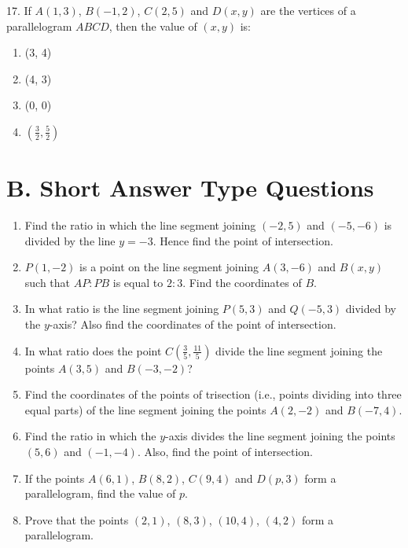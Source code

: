 \documentclass[12pt]{article}
\begin{document}
\begin{multicols}{2}
	17. If $A(1, 3)$, $B(-1, 2)$, $C(2, 5)$ and $D(x, y)$ are the vertices of a parallelogram $ABCD$, then the value of $(x, y)$ is:
	\begin{enumerate}
		\item (3, 4)
		\item (4, 3)
		\item (0, 0)
		\item $\left(\frac{3}{2}, \frac{5}{2}\right)$
	\end{enumerate}
	
	\section*{B. Short Answer Type Questions}
	
	\begin{enumerate}
		\item Find the ratio in which the line segment joining $(-2, 5)$ and $(-5, -6)$ is divided by the line $y = -3$. Hence find the point of intersection.
		
		\item $P(1, -2)$ is a point on the line segment joining $A(3, -6)$ and $B(x, y)$ such that $AP : PB$ is equal to $2 : 3$. Find the coordinates of $B$.
		
		\item In what ratio is the line segment joining $P(5, 3)$ and $Q(-5, 3)$ divided by the $y$-axis? Also find the coordinates of the point of intersection.
		
		\item In what ratio does the point $C\left(\frac{3}{5}, \frac{11}{5}\right)$ divide the line segment joining the points $A(3, 5)$ and $B(-3, -2)$?
		
		\item Find the coordinates of the points of trisection (i.e., points dividing into three equal parts) of the line segment joining the points $A(2, -2)$ and $B(-7, 4)$.
		
		\item Find the ratio in which the $y$-axis divides the line segment joining the points $(5, 6)$ and $(-1, -4)$. Also, find the point of intersection.
		
		\item If the points $A(6, 1)$, $B(8, 2)$, $C(9, 4)$ and $D(p, 3)$ form a parallelogram, find the value of $p$.
		
		\item Prove that the points $(2, 1)$, $(8, 3)$, $(10, 4)$, $(4, 2)$ form a parallelogram.
		

\end{enumerate}
\end{multicols}
\end{document}

